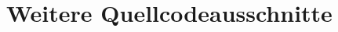 \chapter{Weitere Quellcodeausschnitte}
\label{chap:WeitereQuellcodeausschnitte}

\begin{listing}
    \inputminted{jsx}{snippets/json/manifest.json}
\end{listing}
